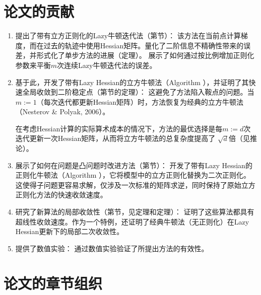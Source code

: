 \documentclass[a4paper,twoside,AutoFakeBold]{article}
\theoremstyle{definition}
\begin{document}
\section{论文的贡献}
\begin{enumerate}
    \item 提出了带有立方正则化的Lazy牛顿迭代法（第节）：
	该方法在当前点计算梯度，而在过去的轨迹中使用Hessian矩阵。量化了二阶信息不精确性带来的误差，并形式化了单步方法的进展（定理）。
	展示了如何通过按比例增加正则化参数来平衡$m$次连续Lazy牛顿迭代法的误差。
	
	\item 基于此，开发了带有Lazy Hessian的立方牛顿法（Algorithm ），并证明了其快速全局收敛到二阶稳定点（第节的定理）：
	这避免了方法陷入鞍点的问题。当$m:=1$（每次迭代都更新Hessian矩阵）时，方法恢复为经典的立方牛顿法（Nesterov \& Polyak, 2006）。
	
	在考虑Hessian计算的实际算术成本的情况下，方法的最优选择是每$m:=d$次迭代更新一次Hessian矩阵，从而将立方牛顿法的总复杂度提高了
	$\sqrt{d}$倍（见推论）。
	
	\item 展示了如何在问题是凸问题时改进方法（第节）：
	开发了带有Lazy Hessian的正则化牛顿法（Algorithm ），它将模型中的立方正则化替换为二次正则化。
	这使得子问题更容易求解，仅涉及一次标准的矩阵求逆，同时保持了原始立方正则化方法的快速收敛速度。
	
	\item 研究了新算法的局部收敛性（第节，见定理和定理）：
	证明了这些算法都具有超线性收敛速度。作为一个特例，还证明了经典牛顿法（无正则化）在Lazy Hessian更新下的局部二次收敛性。
	
	\item 提供了数值实验：
	通过数值实验验证了所提出方法的有效性。
\end{enumerate}
\newpage

\section{论文的章节组织}
\end{document}
